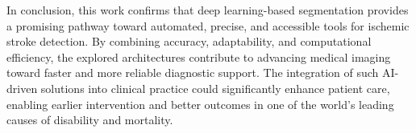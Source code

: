 \documentclass[12pt]{article}
\begin{document}
In conclusion, this work confirms that deep learning-based segmentation provides a promising pathway toward automated, precise, and accessible tools for ischemic stroke detection. By combining accuracy, adaptability, and computational efficiency, the explored architectures contribute to advancing medical imaging toward faster and more reliable diagnostic support. The integration of such AI-driven solutions into clinical practice could significantly enhance patient care, enabling earlier intervention and better outcomes in one of the world’s leading causes of disability and mortality.

\printbibliography[heading=bibintoc,title={References}]
\end{document}
